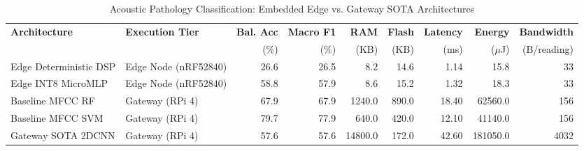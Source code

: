 \begin{table}[t]
\centering
\caption{Acoustic Pathology Classification: Embedded Edge vs. Gateway SOTA Architectures}
\label{tab:acoustic_pareto}
\begin{tabular}{l l r r r r r r r}
\hline
\textbf{Architecture} & \textbf{Execution Tier} & \textbf{Bal. Acc} & \textbf{Macro F1} & \textbf{RAM} & \textbf{Flash} & \textbf{Latency} & \textbf{Energy} & \textbf{Bandwidth} \\
 & & (\%) & (\%) & (KB) & (KB) & (ms) & ($\mu$J) & (B/reading) \\
\hline
Edge Deterministic DSP & Edge Node (nRF52840) & 26.6 & 26.5 & 8.2 & 14.6 & 1.14 & 15.8 & 33 \\
Edge INT8 MicroMLP & Edge Node (nRF52840) & 58.8 & 57.9 & 8.6 & 15.2 & 1.32 & 18.3 & 33 \\
Baseline MFCC RF & Gateway (RPi 4) & 67.9 & 67.9 & 1240.0 & 890.0 & 18.40 & 62560.0 & 156 \\
Baseline MFCC SVM & Gateway (RPi 4) & 79.7 & 77.9 & 640.0 & 420.0 & 12.10 & 41140.0 & 156 \\
Gateway SOTA 2DCNN & Gateway (RPi 4) & 57.6 & 57.6 & 14800.0 & 172.0 & 42.60 & 181050.0 & 4032 \\
\hline
\end{tabular}
\end{table}
